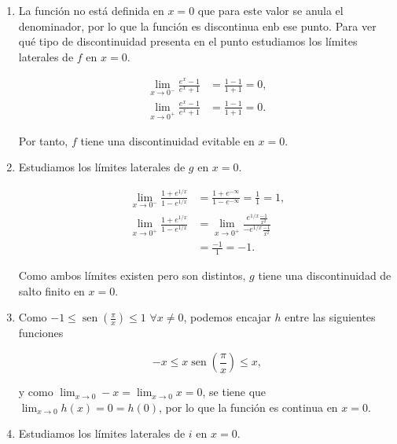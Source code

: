 \documentclass[
  spanish,
  a4paper,
]{scrreport}
\theoremstyle{definition}
\theoremstyle{remark}
\begin{document}
\begin{tcolorbox}[enhanced jigsaw, arc=.35mm, bottomrule=.15mm, bottomtitle=1mm, breakable, colback=white, colbacktitle=quarto-callout-tip-color!10!white, colframe=quarto-callout-tip-color-frame, coltitle=black, left=2mm, leftrule=.75mm, opacityback=0, opacitybacktitle=0.6, rightrule=.15mm, title=\textcolor{quarto-callout-tip-color}{\faLightbulb}\hspace{0.5em}{Solución}, titlerule=0mm, toprule=.15mm, toptitle=1mm]

\begin{enumerate}
\def\labelenumi{\alph{enumi}.}
\item
  La función no está definida en \(x=0\) que para este valor se anula el
  denominador, por lo que la función es discontinua enb ese punto. Para
  ver qué tipo de discontinuidad presenta en el punto estudiamos los
  límites laterales de \(f\) en \(x=0\).

  \begin{align*}
  \lim_{x\to 0^-} \frac{e^x-1}{e^x+1}
  &= \frac{1-1}{1+1} = 0, \\
  \lim_{x\to 0^+} \frac{e^x-1}{e^x+1}
  &= \frac{1-1}{1+1} = 0.
  \end{align*}

  Por tanto, \(f\) tiene una discontinuidad evitable en \(x=0\).
\item
  Estudiamos los límites laterales de \(g\) en \(x=0\).

  \begin{align*}
  \lim_{x\to 0^-} \frac{1+e^{1/x}}{1-e^{1/x}} 
  &= \frac{1+e^{-\infty}}{1-e^{-\infty}}
  = \frac{1}{1} = 1, \\
  \lim_{x\to 0^+} \frac{1+e^{1/x}}{1-e^{1/x}} 
  &= \lim_{x\to 0^+} \frac{e^{1/x}\frac{-1}{x^2}}{-e^{1/x}\frac{-1}{x^2}} \tag{L'Hôpital} \\
  &= \frac{-1}{1} = -1.
  \end{align*}

  Como ambos límites existen pero son distintos, \(g\) tiene una
  discontinuidad de salto finito en \(x=0\).
\item
  Como \(-1\leq \operatorname{sen}\left(\frac{\pi}{x}\right)\leq 1\)
  \(\forall x\neq 0\), podemos encajar \(h\) entre las siguientes
  funciones

  \[
  -x \leq x\operatorname{sen}\left(\frac{\pi}{x}\right) \leq x,
  \]

  y como \(\lim_{x\to 0} -x = \lim_{x\to 0} x = 0\), se tiene que
  \(\lim_{x\to 0} h(x) = 0 = h(0)\), por lo que la función es continua
  en \(x=0\).
\item
  Estudiamos los límites laterales de \(i\) en \(x=0\).


\end{enumerate}
\end{tcolorbox}
\end{document}
